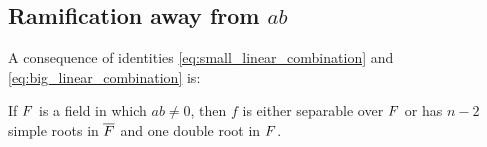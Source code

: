 \documentclass[../main.tex]{subfiles}
\begin{document}
\subsection{Ramification away from $ab$}
A consequence of identities \ref{eq:small_linear_combination} and \ref{eq:big_linear_combination} is:
\begin{lemma}
  \label{lem:multiple_root}
  If $F$ is a field in which $ab \neq 0$, then $f$ is either separable over $F$ or has $n-2$ simple roots in $\overline{F}$ and one double root in $F$.
\end{lemma}
\end{document}
